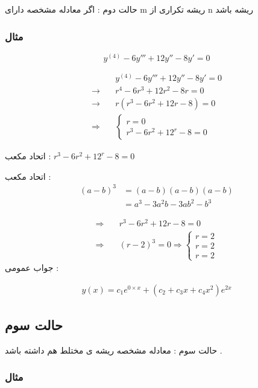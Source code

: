 \documentclass[12pt]{book}
\begin{document}
حالت دوم :
اگر معادله مشخصه دارای m ریشه تکراری از n ریشه باشد


\subsubsection{مثال}

$$
y^{(4)} - 6 y''' + 12 y'' - 8 y' = 0 
$$

\begin{align*}
&y^{(4)} - 6 y''' + 12 y'' - 8 y' = 0 \\
\to \quad &r^{4} - 6r^{3} + 12r^{2} - 8 r = 0 \\
\to \quad &r(r^{3} - 6r^{2} + 12r - 8) = 0 \\
\Rightarrow &\begin{cases} r = 0 \\ 
r^{3} - 6r^{2} + 12^{r} - 8 = 0 \end{cases}
\end{align*}

اتحاد مکعب : 
$r^{3} - 6r^{2} + 12^{r} - 8 = 0$


\begin{tcolorbox}
اتحاد مکعب :
\begin{align*}
(a - b)^{3} &= (a-b)(a-b)(a-b) \\
&= a^{3} - 3a^{2}b - 3ab^{2} - b^{3}
\end{align*}
\end{tcolorbox}

\begin{align*}
\Rightarrow \quad &r^{3} - 6r^{2} + 12r - 8 = 0 \\
\Rightarrow \quad &(r-2)^{3} = 0 \Rightarrow 
\begin{cases}
r = 2 \\
r = 2 \\
r = 2
\end{cases}
\end{align*}
جواب عمومی : 

\begin{align*}
y(x) = c_{1}e^{0 \times x} + (c_{2} + c_{3}x + c_{4}x^{2})e^{2x}
\end{align*}


\subsection{حالت سوم}

حالت سوم : معادله مشخصه ریشه ی مختلط هم داشته باشد .

\subsubsection{مثال}
\end{document}
